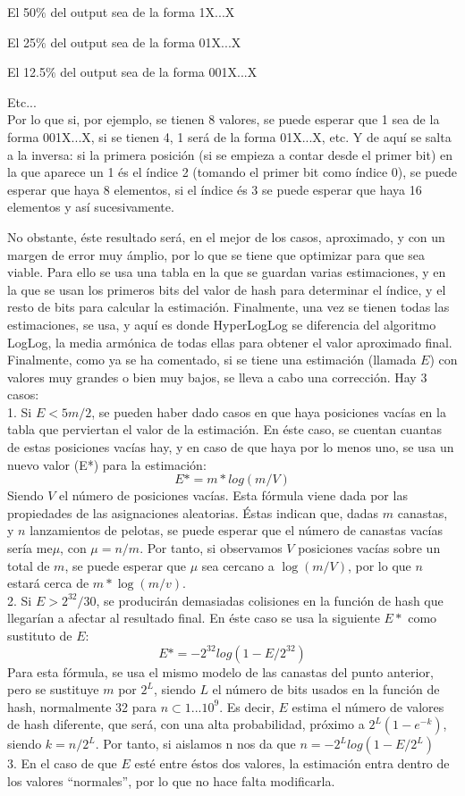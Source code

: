 \documentclass[11pt]{article}
\begin{document}
	El 50$\%$ del output sea de la forma 1X...X
	
	El 25$\%$ del output sea de la forma 01X...X
	
	El 12.5$\%$ del output sea de la forma 001X...X
	
	Etc...
\\
	
Por lo que si, por ejemplo, se tienen 8 valores, se puede esperar que 1 sea de la forma 001X...X, si se tienen 4, 1 será de la forma 01X...X, etc. Y de aquí se salta a la inversa: si la primera posición (si se empieza a contar desde el primer bit) en la que aparece un 1 és el índice 2 (tomando el primer bit como índice 0), se puede esperar que haya 8 elementos, si el índice és 3 se puede esperar que haya 16 elementos y así sucesivamente.

No obstante, éste resultado será, en el mejor de los casos, aproximado, y con un margen de error muy ámplio, por lo que se tiene que optimizar para que sea viable. Para ello se usa una tabla en la que se guardan varias estimaciones, y en la que se usan los primeros bits del valor de hash para determinar el índice, y el resto de bits para calcular la estimación. Finalmente, una vez se tienen todas las estimaciones, se usa, y aquí es donde HyperLogLog se diferencia del algoritmo LogLog, la media armónica de todas ellas para obtener el valor aproximado final.
Finalmente, como ya se ha comentado, si se tiene una estimación (llamada $E$) con valores muy grandes o bien muy bajos, se lleva a cabo una corrección. Hay 3 casos:
\\

1. Si $E < 5m/2$, se pueden haber dado casos en que haya posiciones vacías en la tabla que perviertan el valor de la estimación. En éste caso, se cuentan cuantas de estas posiciones vacías hay, y en caso de que haya por lo menos uno, se usa un nuevo valor (E*) para la estimación: 
$$E* = m*log(m/V)$$
Siendo $V$ el número de posiciones vacías. Esta fórmula viene dada por las propiedades de las asignaciones aleatorias. Éstas indican que, dadas $m$ canastas, y $n$ lanzamientos de pelotas, se puede esperar que el número de canastas vacías sería me$\mu$, con $\mu=n/m$. Por tanto, si observamos $V$ posiciones vacías sobre un total de $m$, se puede esperar que $\mu$ sea cercano a $\log(m/V)$, por lo que $n$ estará cerca de $m*\log(m/v)$.
\\

2. Si $E > 2^{32}/30$, se producirán demasiadas colisiones en la función de hash que llegarían a afectar al resultado final. En éste caso se usa la siguiente $E*$ como sustituto de $E$:
$$E* = -2^{32}log(1-E/2^{32})$$
Para esta fórmula, se usa el mismo modelo de las canastas del punto anterior, pero se sustituye $m$ por $2^L$, siendo $L$ el número de bits usados en la función de hash, normalmente 32 para $n \subset 1...10^9$. Es decir, $E$ estima el número de valores de hash diferente, que será, con una alta probabilidad, próximo a $2^L(1-e^{-k})$, siendo $k = n/2^L$. Por tanto, si aislamos n nos da que 
$n=-2^Llog(1-E/2^L)$
\\

3. En el caso de que $E$ esté entre éstos dos valores, la estimación entra dentro de los valores “normales”, por lo que no hace falta modificarla.
	
\end{document}
